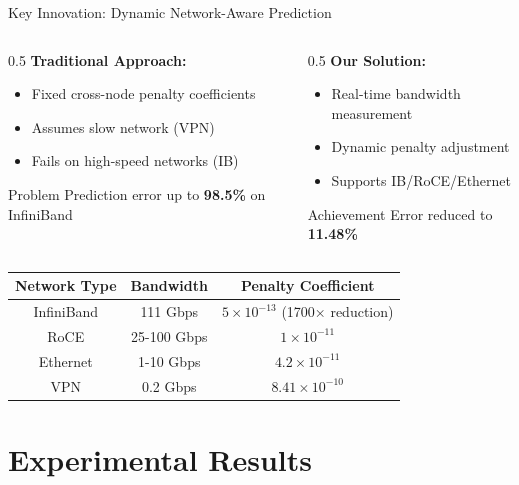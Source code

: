 \documentclass[aspectratio=169,10pt]{beamer}
\begin{document}
\begin{frame}{Key Innovation: Dynamic Network-Aware Prediction}
\begin{columns}
\begin{column}{0.5\textwidth}
\textbf{Traditional Approach:}
\begin{itemize}
    \item Fixed cross-node penalty coefficients
    \item Assumes slow network (VPN)
    \item Fails on high-speed networks (IB)
\end{itemize}
\vspace{0.3cm}
\begin{alertblock}{Problem}
Prediction error up to \textbf{98.5\%} on InfiniBand
\end{alertblock}
\end{column}
\begin{column}{0.5\textwidth}
\textbf{Our Solution:}
\begin{itemize}
    \item Real-time bandwidth measurement
    \item Dynamic penalty adjustment
    \item Supports IB/RoCE/Ethernet
\end{itemize}
\vspace{0.3cm}
\begin{block}{Achievement}
Error reduced to \textbf{11.48\%}
\end{block}
\end{column}
\end{columns}
\vspace{0.5cm}
\begin{center}
\begin{tabular}{ccc}
\toprule
\textbf{Network Type} & \textbf{Bandwidth} & \textbf{Penalty Coefficient} \\
\midrule
InfiniBand & 111 Gbps & $5\times10^{-13}$ (1700× reduction) \\
RoCE & 25-100 Gbps & $1\times10^{-11}$ \\
Ethernet & 1-10 Gbps & $4.2\times10^{-11}$ \\
VPN & 0.2 Gbps & $8.41\times10^{-10}$ \\
\bottomrule
\end{tabular}
\end{center}
\end{frame}

\section{Experimental Results}
\end{document}
